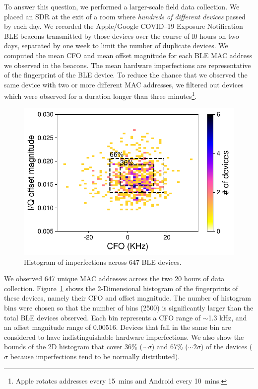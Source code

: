To answer this question, we performed a larger-scale field data collection. We
placed an SDR at the exit of a room where \emph{hundreds of different
devices} passed by each day.  We recorded the Apple/Google COVID--19
Exposure Notification BLE beacons transmitted by those devices over the course of l0 hours on two days, separated by
one week to limit the number of duplicate devices. We computed the
mean CFO and mean \iq offset magnitude for each BLE MAC address
we observed in the beacons. The mean hardware imperfections are representative of the fingerprint of the BLE device. To reduce the chance that we observed the same
device with two or more different MAC addresses, we filtered out devices
which were observed for a duration longer than three minutes\footnote{Apple rotates addresses every 15~mins and Android every 10~mins.}. 


\begin{figure}[!h]
    \centering
    \captionsetup{justification=centering}
    \includegraphics[width = 0.8\linewidth]{bletracking/plots/heatmap_hallway.pdf} 
    \caption{Histogram of imperfections across 647 BLE devices.}
    \label{fig:heatmap_hallway}
\end{figure}


We observed 647 unique MAC addresses 
across the two 20 hours of data collection.
Figure~\ref{fig:heatmap_hallway} shows the 2-Dimensional histogram of the fingerprints of these devices, namely their CFO and \iq offset magnitude.
%
The number of histogram bins were chosen so that the number of bins (2500) is significantly larger than the total BLE devices observed. Each bin represents a CFO range of $\sim$1.3 kHz, and an \iq offset magnitude range of 0.00516.
%
Devices that fall in the same bin are considered to have indistinguishable hardware imperfections.
%
We also show the
bounds of the 2D histogram that cover 36\% ($\sim$$\sigma$) and
67\% ($\sim$$2\sigma$) of the devices ($\sigma$ because imperfections tend to be normally distributed). 

